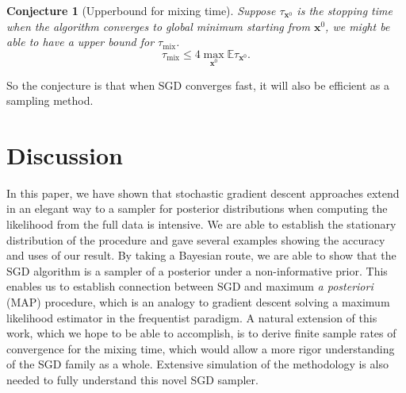 \documentclass[preprint,12pt,3p]{elsarticle}
\newcommand{\bx}{\mathbf{x}}
\newcommand{\E}{\mathbb{E}}
\newtheorem{conjecture}{Conjecture}
\begin{document}
\begin{conjecture}[Upperbound for mixing time] Suppose $\tau_{\bx^0}$ is the stopping time when the algorithm converges to global minimum starting from $\bx^0$, we might be able to have a upper bound for $\tau_{\mathrm{mix}}$.
\[
\tau_{\mathrm{mix}} \leq 4 \max_{\bx^0}\E \tau_{\bx^0}.
\]
\end{conjecture}

So the conjecture is that when SGD converges fast, it will also be efficient as a sampling method.


\section{Discussion} %
\label{sec:discussion}


In this paper, we have shown that stochastic gradient descent approaches extend in an elegant way to a sampler for posterior distributions when computing the likelihood from the full data is intensive. We are able to establish the stationary distribution of the procedure and gave several examples showing the accuracy and uses of our result. By taking a Bayesian route, we are able to show that the SGD algorithm is a sampler of a posterior under a non-informative prior. This enables us to establish connection between SGD and maximum \emph{a posteriori} (MAP) procedure, which is an analogy to gradient descent solving a maximum likelihood estimator in the frequentist paradigm. A natural extension of this work, which we hope to be able to accomplish, is to derive finite sample rates of convergence for the mixing time, which would allow a more rigor understanding of the SGD family as a whole. Extensive simulation of the methodology is also needed to fully understand this novel SGD sampler.
\end{document}
